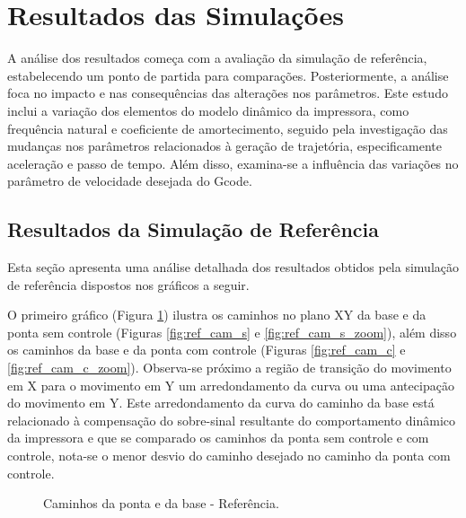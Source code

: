 \section{Resultados das Simulações}
A análise dos resultados começa com a avaliação da simulação de referência, estabelecendo um ponto de partida para comparações. Posteriormente, a análise foca no impacto e nas consequências das alterações nos parâmetros. Este estudo inclui a variação dos elementos do modelo dinâmico da impressora, como frequência natural e coeficiente de amortecimento, seguido pela investigação das mudanças nos parâmetros relacionados à geração de trajetória, especificamente aceleração e passo de tempo. Além disso, examina-se a influência das variações no parâmetro de velocidade desejada do Gcode.

\subsection{Resultados da Simulação de Referência}
Esta seção apresenta uma análise detalhada dos resultados obtidos pela simulação de referência dispostos nos gráficos a seguir.

O primeiro gráfico (Figura \ref{fig:ref_cam}) ilustra os caminhos no plano XY da base e da ponta sem controle (Figuras \ref{fig:ref_cam_s} e \ref{fig:ref_cam_s_zoom}), além disso os caminhos da base e da ponta com controle (Figuras \ref{fig:ref_cam_c} e \ref{fig:ref_cam_c_zoom}). Observa-se próximo a região de transição do movimento em X para o movimento em Y um arredondamento da curva ou uma antecipação do movimento em Y.
Este arredondamento da curva do caminho da base está relacionado à compensação do sobre-sinal resultante do comportamento dinâmico da impressora e que se comparado os caminhos da ponta sem controle e com controle, nota-se o menor desvio do caminho desejado no caminho da ponta com controle.

\begin{figure}[H]
    \centering
    \hfill
    \hfill
    \hfill
    \caption{Caminhos da ponta e da base - Referência.}
    \label{fig:ref_cam}
\end{figure}

